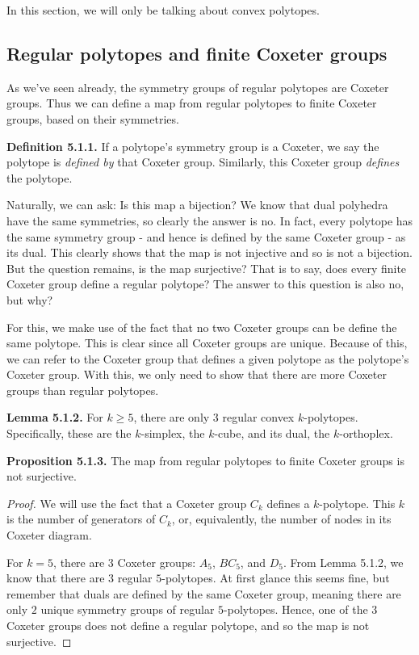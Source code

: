 \documentclass[../main.tex]{subfiles}
\begin{document}
In this section, we will only be talking about convex polytopes.

\subsection{Regular polytopes and finite Coxeter groups}

As we've seen already, the symmetry groups of regular polytopes are Coxeter groups. Thus we can define a map from regular polytopes to finite Coxeter groups, based on their symmetries.\newline

\noindent\textbf{Definition 5.1.1.} If a polytope's symmetry group is a Coxeter, we say the polytope is \textit{defined by} that Coxeter group. Similarly, this Coxeter group \textit{defines} the polytope.\newline

Naturally, we can ask: Is this map a bijection? We know that dual polyhedra have the same symmetries, so clearly the answer is no. In fact, every polytope has the same symmetry group - and hence is defined by the same Coxeter group - as its dual. This clearly shows that the map is not injective and so is not a bijection. But the question remains, is the map surjective? That is to say, does every finite Coxeter group define a regular polytope? The answer to this question is also no, but why?

For this, we make use of the fact that no two Coxeter groups can be define the same polytope. This is clear since all Coxeter groups are unique. Because of this, we can refer to the Coxeter group that defines a given polytope as the polytope's Coxeter group. With this, we only need to show that there are more Coxeter groups than regular polytopes.\newline

\noindent\textbf{Lemma 5.1.2.} For $k \geq 5$, there are only 3 regular convex $k$-polytopes. Specifically, these are the $k$-simplex, the $k$-cube, and its dual, the $k$-orthoplex.\cite{Coxeter1973}\newline

\noindent\textbf{Proposition 5.1.3.} The map from regular polytopes to finite Coxeter groups is not surjective.
\begin{proof}
    We will use the fact that a Coxeter group $C_k$ defines a $k$-polytope. This $k$ is the number of generators of $C_k$, or, equivalently, the number of nodes in its Coxeter diagram.
    
    For $k = 5$, there are $3$ Coxeter groups: $A_5$, $BC_5$, and $D_5$. From Lemma 5.1.2, we know that there are $3$ regular $5$-polytopes. At first glance this seems fine, but remember that duals are defined by the same Coxeter group, meaning there are only $2$ unique symmetry groups of regular $5$-polytopes. Hence, one of the $3$ Coxeter groups does not define a regular polytope, and so the map is not surjective.
\end{proof}
\end{document}
